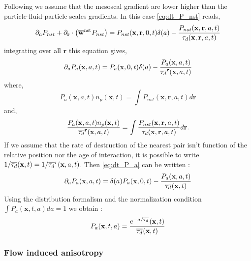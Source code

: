 Following \citet{zhang2023evolution} we assume that the mesoscal gradient are lower higher than the particle-fluid-particle scales gradients. 
In this case \ref{eq:dt_P_nst} reads, 
\begin{equation}
    \partial_a P_{nst} 
    + \partial_\textbf{r} \cdot \left( \overline{\textbf{w}}^\text{nst} P_{nst} \right) 
    = P_{nst}(\textbf{x},\textbf{r},0,t)\delta(a)
    - \frac{P_{nst}(\textbf{x},\textbf{r},a,t)}{\tau_d(\textbf{x},\textbf{r},a,t)}
\end{equation}
integrating over all $\textbf{r}$ this equation gives, 
\begin{equation}
    \partial_a P_{a} (\textbf{x},a,t)
    = P_{a}(\textbf{x},0,t)\delta(a)
    - \frac{P_{a}(\textbf{x},a,t)}{\overline{\tau_d}^{\textbf{r}}(\textbf{x},a,t)}
    \label{eq:dt_P_a}
\end{equation}
where, 
\begin{equation}
    P_a(\textbf{x},a,t)n_p(\textbf{x},t)
    = \int P_{nst}(\textbf{x},\textbf{r},a,t) d\textbf{r}
\end{equation}
and,
\begin{equation}
    \frac{P_{a}(\textbf{x},a,t) n_p(\textbf{x},t)}{\overline{\tau_d}^{\textbf{r}}(\textbf{x},a,t)}
    = \int 
    \frac{P_{nst}(\textbf{x},\textbf{r},a,t)}{\tau_d(\textbf{x},\textbf{r},a,t)}
    d\textbf{r}.
\end{equation}
If we assume that the rate of destruction of the nearest pair isn't function of the relative position nor the age of interaction, it is possible to write $1/\overline{\tau_d}(\textbf{x},t) = 1/ \overline{\tau_d}^{r}(\textbf{x},a,t)$.
Then  \ref{eq:dt_P_a} can be written :
\begin{equation}
    \partial_a P_{a} (\textbf{x},a,t)
    = \delta(a) P_{a}(\textbf{x},0,t)
    - \frac{P_{a}(\textbf{x},a,t)}{\overline{\tau_d}^{}(\textbf{x},t)}
\end{equation}
Using the distribution formalism and the normalization condition $\int P_a(\textbf{x},t,a) da = 1$ we obtain : 
\begin{equation}
    P_a(\textbf{x},t,a)
    =\frac{e^{- a/\overline{\tau_d}^{}}(\textbf{x},t)}{\overline{\tau_d}^{}(\textbf{x},t)}
\end{equation}




\subsubsection{Flow induced anisotropy}

